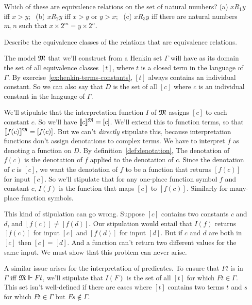 \begin{exercise}
  Which of these are equivalence relations on the set of natural numbers?
  (a) $x R_1 y$ iff ${x > y}$;
  \, (b) $x R_2 y$ iff ${x > y}$ or ${y > x}$;
  \, (c) $x R_3 y$ iff there are natural numbers $m,n$ such that ${x \times 2^m} = {y \times 2^n}$.

  Describe the equivalence classes of the relations that are equivalence relations.
\end{exercise}

The model $\mathfrak{M}$ that we'll construct from a Henkin set $\Gamma$ will have as its domain
the set of all equivalence classes $[t]$,
where $t$ is a closed term in the language of $\Gamma$.
By exercise~\ref{ex:henkin-terms-constants},
$[t]$ always contains an individual constant.
So we can also say that $D$ is the set of all $[c]$
where $c$ is an individual constant in the language of $\Gamma$.

We'll stipulate that
the interpretation function $I$ of $\mathfrak{M}$
assigns $[c]$ to each constant $c$.
So we'll have $\llbracket c \rrbracket^{\mathfrak{M}} = [c]$.
We'll extend this to function terms,
so that $\llbracket f(c) \rrbracket^{\mathfrak{M}} = [f(c)]$.
But we can't \emph{directly} stipulate this,
because interpretation functions don't assign denotations to complex terms.
We have to interpret $f$ as denoting a function on $D$.
By definition~\ref{def:denotation},
The denotation of $f(c)$ is
the denotation of $f$ applied to the denotation of $c$.
Since the denotation of $c$ is $[c]$,
we want the denotation of $f$ to be a function that returns $[f(c)]$ for input $[c]$.
So we'll stipulate that for any one-place function symbol $f$ and constant $c$,
$I(f)$ is the function that maps $[c]$ to $[f(c)]$.
Similarly for many-place function symbols.

This kind of stipulation can go wrong.
Suppose $[c]$ contains two constants $c$ and $d$,
and $[f(c)] \neq [f(d)]$.
Our stipulation would entail that $I(f)$
returns $[f(c)]$ for input $[c]$
and $[f(d)]$ for input $[d]$.
But if $c$ and $d$ are both in $[c]$ then $[c] = [d]$.
And a function can't return two different values for the same input.
We must show that this problem can never arise.

A similar issue arises for the interpretation of predicates.
To ensure that $Ft$ is in $\Gamma$ iff $\mathfrak{M} \Vdash Ft$,
we'll stipulate that
$I(F)$ is the set of all $[t]$ for which $Ft \in \Gamma$.
This set isn't well-defined if
there are cases where $[t]$ contains two terms $t$ and $s$
for which $Ft \in \Gamma$ but $Fs \notin \Gamma$.

